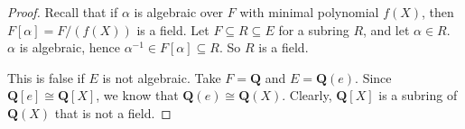 \documentclass[10pt]{article}
\newcommand{\Q}{\mathbf{Q}}
\begin{document}
\begin{enumerate}
\begin{proof}
Recall that if $\alpha$ is algebraic over $F$ with minimal polynomial $f(X)$, then $F[\alpha] = F / (f(X))$ is a field.  Let $F \subseteq R \subseteq E$ for a subring $R$, and let $\alpha \in R$.  $\alpha$ is algebraic, hence $\alpha^{-1} \in F[\alpha] \subseteq R$.  So $R$ is a field.

This is false if $E$ is not algebraic.  Take $F = \Q$ and $E = \Q(e)$.  Since $\Q[e] \cong \Q[X]$, we know that $\Q(e) \cong \Q(X)$.  Clearly, $\Q[X]$ is a subring of $\Q(X)$ that is not a field.
\end{proof}

\end{enumerate}
\end{document}
